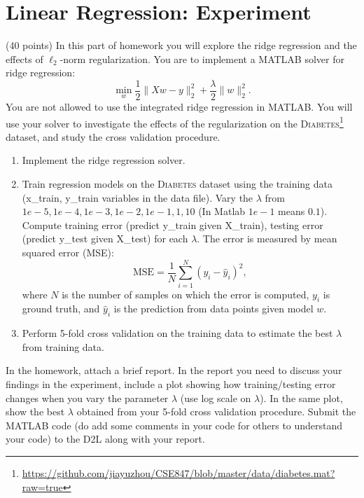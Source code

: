 \documentclass[11pt]{article}
\begin{document}
\begin{enumerate}
\end{enumerate}

\section{Linear Regression: Experiment} 

 (40 points) In this part of homework you will explore the ridge regression and the effects of
$\ell_2$-norm regularization. You are to implement a MATLAB solver for ridge regression:
$$ \min_w \frac{1}{2}\|Xw - y\|_2^2 + \frac{\lambda}{2} \|w\|_2^2. $$
You are not allowed to use the integrated ridge regression in MATLAB.
You will use your solver to investigate the effects of the regularization on the \textsc{Diabetes}\footnote{\url{https://github.com/jiayuzhou/CSE847/blob/master/data/diabetes.mat?raw=true}}
dataset, and study the cross validation procedure.

\begin{enumerate}
\item Implement the ridge regression solver.  
\item Train regression models on the \textsc{Diabetes} dataset using 
the training data (x\_train, y\_train variables in the data file). 
Vary the $\lambda$ from ${1e-5}, {1e-4}, {1e-3}, {1e-2}, {1e-1}, 1, 10$ (In 
Matlab $1e-1$ means $0.1$). 
Compute training error (predict y\_train given X\_train), testing error (predict y\_test given X\_test) for each $\lambda$. 
The error is measured by mean squared error (MSE):
$$
\mbox{MSE} = \frac{1}{N}\sum_{i=1}^N (y_i - \hat y_i)^2,
$$
where $N$ is the number of samples on which the error is computed, $y_i$ 
is ground truth, and $\hat y_i$ is the prediction from data points 
given model $w$. 
\item Perform 5-fold cross validation on the training data to estimate the best $\lambda$ from training data.
\end{enumerate}

In the homework, attach a brief report. In the report you need to
discuss your findings in the experiment, include a plot showing how
training/testing error changes when you vary the parameter $\lambda$ (use log
scale on $\lambda$). In the same plot, show the best $\lambda$ obtained from
your 5-fold cross validation procedure. Submit the MATLAB code (do add some comments in your code for others to understand your code) to the D2L along with your report. 
\end{document}
